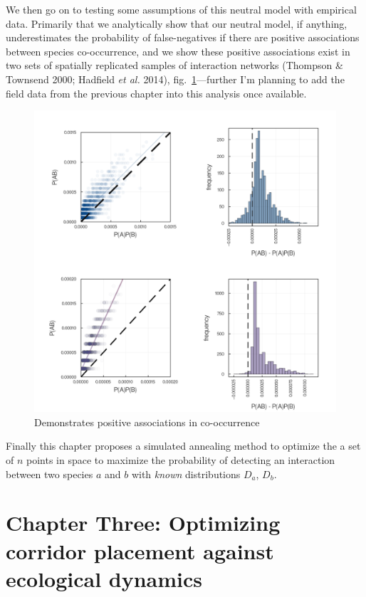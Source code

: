 \documentclass[10pt,oneside]{article}
\makeatletter
\def\maxwidth{\ifdim\Gin@nat@width>\linewidth\linewidth
\else\Gin@nat@width\fi}
\let\Oldincludegraphics\includegraphics
\renewcommand{\includegraphics}[1]{\Oldincludegraphics[width=\maxwidth]{#1}}
\makeatother
\begin{document}
We then go on to testing some assumptions of this neutral model with
empirical data. Primarily that we analytically show that our neutral
model, if anything, underestimates the probability of false-negatives if
there are positive associations between species co-occurrence, and we
show these positive associations exist in two sets of spatially
replicated samples of interaction networks (Thompson \& Townsend 2000;
Hadfield \emph{et al.} 2014), fig.~\ref{fig:posassoc}---further I'm
planning to add the field data from the previous chapter into this
analysis once available.

\begin{figure}
\hypertarget{fig:posassoc}{%
\centering
\includegraphics{./figures/positiveassociations.png}
\caption{Demonstrates positive associations in
co-occurrence}\label{fig:posassoc}
}
\end{figure}

Finally this chapter proposes a simulated annealing method to optimize
the a set of \(n\) points in space to maximize the probability of
detecting an interaction between two species \(a\) and \(b\) with
\emph{known} distributions \(D_a\), \(D_b\).

\hypertarget{chapter-three-optimizing-corridor-placement-against-ecological-dynamics}{%
\section{Chapter Three: Optimizing corridor placement against ecological
dynamics}\label{chapter-three-optimizing-corridor-placement-against-ecological-dynamics}}
\end{document}
